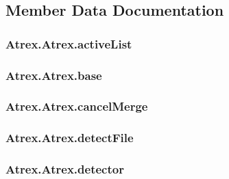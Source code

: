 \subsection{Member Data Documentation}
\hypertarget{class_atrex_1_1_atrex_a845e289d7ed3657f89da88d1d53657bc}{
\subsubsection[{active\-List}]{\setlength{\rightskip}{0pt plus 5cm}Atrex.\-Atrex.\-active\-List}}\label{class_atrex_1_1_atrex_a845e289d7ed3657f89da88d1d53657bc}
\hypertarget{class_atrex_1_1_atrex_a2080a9ed5c4661217ebd6fa108ef2e68}{
\subsubsection[{base}]{\setlength{\rightskip}{0pt plus 5cm}Atrex.\-Atrex.\-base}}\label{class_atrex_1_1_atrex_a2080a9ed5c4661217ebd6fa108ef2e68}
\hypertarget{class_atrex_1_1_atrex_a5034cf92d78b203761c82c2d09571fe7}{
\subsubsection[{cancel\-Merge}]{\setlength{\rightskip}{0pt plus 5cm}Atrex.\-Atrex.\-cancel\-Merge}}\label{class_atrex_1_1_atrex_a5034cf92d78b203761c82c2d09571fe7}
\hypertarget{class_atrex_1_1_atrex_ac6283b2b56309698f9b3881fd1cb0ba2}{
\subsubsection[{detect\-File}]{\setlength{\rightskip}{0pt plus 5cm}Atrex.\-Atrex.\-detect\-File}}\label{class_atrex_1_1_atrex_ac6283b2b56309698f9b3881fd1cb0ba2}
\hypertarget{class_atrex_1_1_atrex_a47354f98e68c5aadcd988d0a2b476889}{
\subsubsection[{detector}]{\setlength{\rightskip}{0pt plus 5cm}Atrex.\-Atrex.\-detector}}\label{class_atrex_1_1_atrex_a47354f98e68c5aadcd988d0a2b476889}
